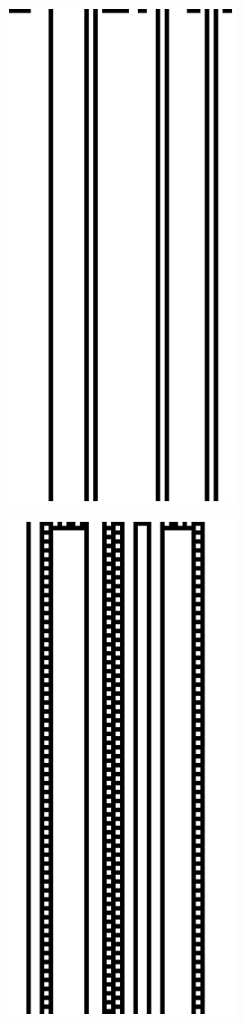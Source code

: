 \begin{figure}
\begin{subfigure}[b]{0.275\textwidth}
		\caption[]{}%
   \end{subfigure}%
   \hfill
       \begin{subfigure}[b]{0.275\textwidth}
   	\centering
   	\includegraphics[scale=0.32]{./images/CA_FDM/rule4}
   	\caption[]{}%
   \end{subfigure}%
   \begin{subfigure}[b]{0.275\textwidth}
   	\centering
   	\includegraphics[scale=0.32]{./images/CA_FDM/rule108}
   \caption[]{}%
   \end{subfigure}%
        
\end{figure}

